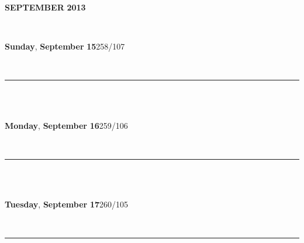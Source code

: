 \documentclass[11pt]{article}
\begin{document}
{}%
\pagestyle{empty}{}%
\vspace*{-1.5in}%
\begin{center}{}%
\textbf{\Huge \uppercase{September}}\hspace*{2em}%
\textbf{\Huge 2013}\\[.5cm]%
% 
\end{center}{}%
\hspace*{-.2in}%
\parbox[l]{7in}{%


\ \\[-.2cm]{}%
\noindent{}%
\parbox[l]{6.8in}{%
\textbf{\large Sunday}, \textbf{\large September} \textbf{\large 15}\hfill 258/107%
}%
\\[-.3cm]%
\rule[0pt]{6.8in}{.2mm}\\[-.1cm]%




\ \\[-.2cm]{}%
\noindent{}%
\parbox[l]{6.8in}{%
\textbf{\large Monday}, \textbf{\large September} \textbf{\large 16}\hfill 259/106%
}%
\\[-.3cm]%
\rule[0pt]{6.8in}{.2mm}\\[-.1cm]%



\ \\[-.2cm]{}%
\noindent{}%
\parbox[l]{6.8in}{%
\textbf{\large Tuesday}, \textbf{\large September} \textbf{\large 17}\hfill 260/105%
}%
\\[-.3cm]%
\rule[0pt]{6.8in}{.2mm}\\[-.1cm]%



}%
\end{document}
